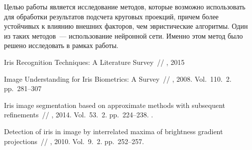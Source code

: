 \documentclass[12pt, twoside]{article}
\begin{document}
Целью работы является исследование методов, которые возможно использовать для обработки результатов подсчета круговых проекций, причем более устойчивых к влиянию внешних факторов, чем эвристические алгоритмы. Один из таких методов~--- использование нейронной сети. Именно этом метод было решено исследовать в рамках работы.


\begin{thebibliography}{99}


   Iris Recognition Techniques: A Literature Survey~//
    , 2015

   Image Understanding for Iris Biometrics: A Survey~//
    , 2008. Vol.~110. \No\,2. pp.~281--307
	
   Iris image segmentation based on approximate methods
with subsequent refinements~//
    , 2014. Vol.~53. \No\,2. pp.~224--238.
	.
	
   Detection of iris in image by interrelated maxima of brightness gradient projections~//
    , 2010. Vol.~9. \No\,2. pp.~252--257.
	
 
 	
\end{thebibliography}

\end{document}
